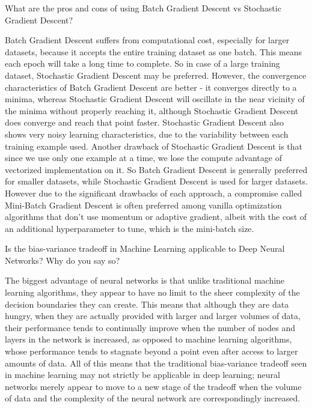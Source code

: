 	\begin{qanda}
		\begin{question}
What are the pros and cons of using Batch Gradient Descent vs Stochastic Gradient Descent?
		\end{question}
		\begin{answer}
Batch Gradient Descent suffers from computational cost, especially for larger datasets, because it accepts the entire training dataset as one batch. This means each epoch will take a long time to complete. So in case of a large training dataset, Stochastic Gradient Descent may be preferred. However, the convergence characteristics of Batch Gradient Descent are better - it converges directly to a minima, whereas Stochastic Gradient Descent will oscillate in the near vicinity of the minima without properly reaching it, although Stochastic Gradient Descent does converge and reach that point faster. Stochastic Gradient Descent also shows very noisy learning characteristics, due to the variability between each training example used. Another drawback of Stochastic Gradient Descent is that since we use only one example at a time, we lose the compute advantage of vectorized implementation on it. So Batch Gradient Descent is generally preferred for smaller datasets, while Stochastic Gradient Descent is used for larger datasets. However due to the significant drawbacks of each approach, a compromise called Mini-Batch Gradient Descent is often preferred among vanilla optimization algorithms that don't use momentum or adaptive gradient, albeit with the cost of an additional hyperparameter to tune, which is the mini-batch size.
		\end{answer}
	\end{qanda}

	\begin{qanda}
		\begin{question}
Is the bias-variance tradeoff in Machine Learning applicable to Deep Neural Networks? Why do you say so?
		\end{question}
		\begin{answer}
The biggest advantage of neural networks is that unlike traditional machine learning algorithms, they appear to have no limit to the sheer complexity of the decision boundaries they can create. This means that although they are data hungry, when they are actually provided with larger and larger volumes of data, their performance tends to continually improve when the number of nodes and layers in the network is increased, as opposed to machine learning algorithms, whose performance tends to stagnate beyond a point even after access to larger amounts of data. All of this means that the traditional bias-variance tradeoff seen in machine learning may not strictly be applicable in deep learning; neural networks merely appear to move to a new stage of the tradeoff when the volume of data and the complexity of the neural network are correspondingly increased.
		\end{answer}
	\end{qanda}

